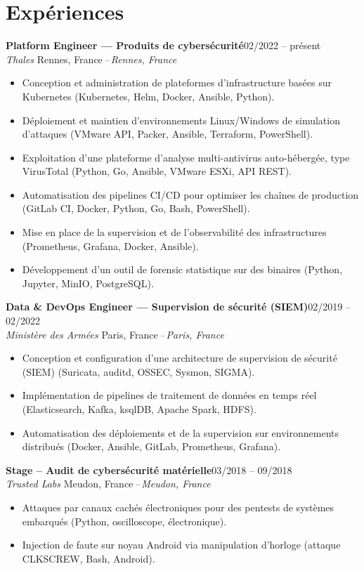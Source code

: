 \documentclass[10pt,a4paper]{article}
\newcommand{\cventry}[4]{%
  \textbf{#1}\hfill\textcolor{muted}{\small #4}\\[0.5pt]%
  \textcolor{accent}{\itshape #2}%
  \ifx\relax#3\relax\else\textcolor{muted}{\itshape\,--\,#3}\fi\par\vspace{1.5pt}%
}
\begin{document}
\vspace{-7pt}
\section{Expériences}

\cventry{Platform Engineer --- Produits de cybersécurité}{Thales}{Rennes, France}{02/2022 -- présent}
\begin{itemize}
  \item Conception et administration de plateformes d'infrastructure basées sur Kubernetes (Kubernetes, Helm, Docker, Ansible, Python).
  \item Déploiement et maintien d'environnements Linux/Windows de simulation d'attaques (VMware API, Packer, Ansible, Terraform, PowerShell).
  \item Exploitation d'une plateforme d'analyse multi-antivirus auto-hébergée, type VirusTotal (Python, Go, Ansible, VMware ESXi, API REST).
  \item Automatisation des pipelines CI/CD pour optimiser les chaînes de production (GitLab CI, Docker, Python, Go, Bash, PowerShell).
  \item Mise en place de la supervision et de l'observabilité des infrastructures (Prometheus, Grafana, Docker, Ansible).
  \item Développement d'un outil de forensic statistique sur des binaires (Python, Jupyter, MinIO, PostgreSQL).
\end{itemize}

\cventry{Data \& DevOps Engineer --- Supervision de sécurité (SIEM)}{Ministère des Armées}{Paris, France}{02/2019 -- 02/2022}
\begin{itemize}
  \item Conception et configuration d'une architecture de supervision de sécurité (SIEM) (Suricata, auditd, OSSEC, Sysmon, SIGMA).
  \item Implémentation de pipelines de traitement de données en temps réel (Elasticsearch, Kafka, ksqlDB, Apache Spark, HDFS).
  \item Automatisation des déploiements et de la supervision sur environnements distribués (Docker, Ansible, GitLab, Prometheus, Grafana).
\end{itemize}

\cventry{Stage -- Audit de cybersécurité matérielle}{Trusted Labs}{Meudon, France}{03/2018 -- 09/2018}
\begin{itemize}
  \item Attaques par canaux cachés électroniques pour des pentests de systèmes embarqués (Python, oscilloscope, électronique).
  \item Injection de faute sur noyau Android via manipulation d'horloge (attaque CLKSCREW, Bash, Android).
\end{itemize}
\end{document}
